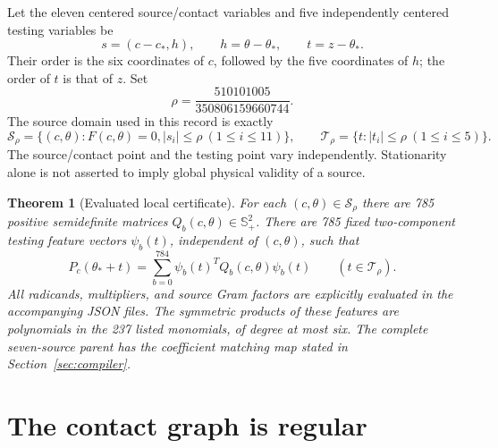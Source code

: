 \documentclass[11pt]{article}
\newcommand{\Splus}{\mathbb S_+}
\newtheorem{theorem}{Theorem}
\theoremstyle{definition}
\begin{document}
Let the eleven centered source/contact variables and five independently
centered testing variables be
\begin{equation}
 s=(c-c_*,h),\qquad h=\theta-\theta_*,\qquad
 t=z-\theta_*.
 \label{eq:center}
\end{equation}
Their order is the six coordinates of $c$, followed by the five coordinates
of $h$; the order of $t$ is that of $z$. Set
\begin{equation}
 \rho=\frac{510101005}{350806159660744}.
 \label{eq:rho}
\end{equation}
The source domain used in this record is exactly
\begin{equation}
 \mathcal S_\rho=\{(c,\theta):F(c,\theta)=0, |s_i|\leq\rho
 \ (1\leq i\leq11)\},
 \qquad
 \mathcal T_\rho=\{t:|t_i|\leq\rho\ (1\leq i\leq5)\}.
 \label{eq:domain}
\end{equation}
The source/contact point and the testing point vary independently. Stationarity
alone is not asserted to imply global physical validity of a source.

\begin{theorem}[Evaluated local certificate]\label{thm:main}
For each $(c,\theta)\in\mathcal S_\rho$ there are 785 positive semidefinite
matrices $Q_b(c,\theta)\in\Splus^2$. There are 785 fixed two-component testing
feature vectors $\psi_b(t)$, independent of $(c,\theta)$, such that
\begin{equation}
 P_c(\theta_*+t)=\sum_{b=0}^{784}\psi_b(t)^TQ_b(c,\theta)\psi_b(t)
 \qquad(t\in\mathcal T_\rho).
 \label{eq:main}
\end{equation}
All radicands, multipliers, and source Gram factors are explicitly evaluated in
the accompanying JSON files. The symmetric products of these features are
polynomials in the 237 listed monomials, of degree at most six. The complete
seven-source parent has the coefficient matching map stated in
Section~\ref{sec:compiler}.
\end{theorem}

\section{The contact graph is regular}
\end{document}
